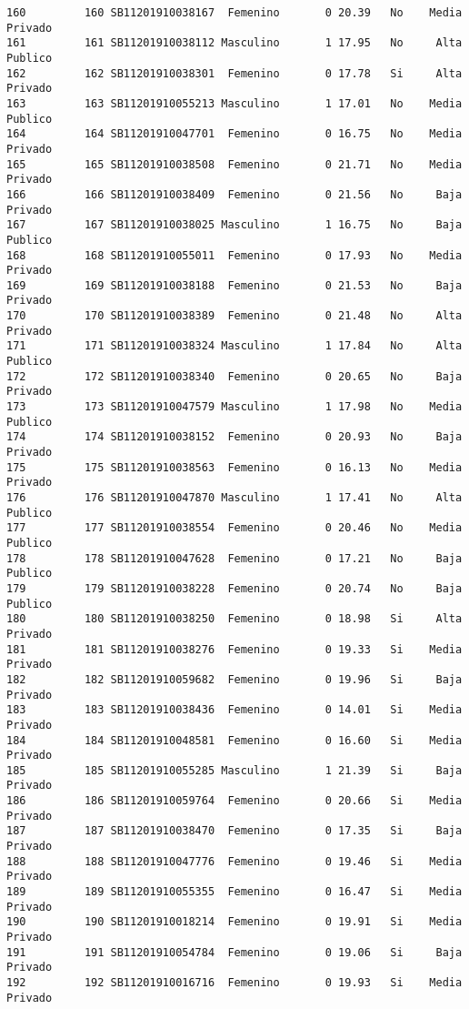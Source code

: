 \documentclass[
  letterpaper,
  DIV=11,
  numbers=noendperiod]{scrartcl}
\begin{document}
\begin{verbatim}
160         160 SB11201910038167  Femenino       0 20.39   No    Media Privado
161         161 SB11201910038112 Masculino       1 17.95   No     Alta Publico
162         162 SB11201910038301  Femenino       0 17.78   Si     Alta Privado
163         163 SB11201910055213 Masculino       1 17.01   No    Media Publico
164         164 SB11201910047701  Femenino       0 16.75   No    Media Privado
165         165 SB11201910038508  Femenino       0 21.71   No    Media Privado
166         166 SB11201910038409  Femenino       0 21.56   No     Baja Privado
167         167 SB11201910038025 Masculino       1 16.75   No     Baja Publico
168         168 SB11201910055011  Femenino       0 17.93   No    Media Privado
169         169 SB11201910038188  Femenino       0 21.53   No     Baja Privado
170         170 SB11201910038389  Femenino       0 21.48   No     Alta Privado
171         171 SB11201910038324 Masculino       1 17.84   No     Alta Publico
172         172 SB11201910038340  Femenino       0 20.65   No     Baja Privado
173         173 SB11201910047579 Masculino       1 17.98   No    Media Publico
174         174 SB11201910038152  Femenino       0 20.93   No     Baja Privado
175         175 SB11201910038563  Femenino       0 16.13   No    Media Privado
176         176 SB11201910047870 Masculino       1 17.41   No     Alta Publico
177         177 SB11201910038554  Femenino       0 20.46   No    Media Publico
178         178 SB11201910047628  Femenino       0 17.21   No     Baja Publico
179         179 SB11201910038228  Femenino       0 20.74   No     Baja Publico
180         180 SB11201910038250  Femenino       0 18.98   Si     Alta Privado
181         181 SB11201910038276  Femenino       0 19.33   Si    Media Privado
182         182 SB11201910059682  Femenino       0 19.96   Si     Baja Privado
183         183 SB11201910038436  Femenino       0 14.01   Si    Media Privado
184         184 SB11201910048581  Femenino       0 16.60   Si    Media Privado
185         185 SB11201910055285 Masculino       1 21.39   Si     Baja Privado
186         186 SB11201910059764  Femenino       0 20.66   Si    Media Privado
187         187 SB11201910038470  Femenino       0 17.35   Si     Baja Privado
188         188 SB11201910047776  Femenino       0 19.46   Si    Media Privado
189         189 SB11201910055355  Femenino       0 16.47   Si    Media Privado
190         190 SB11201910018214  Femenino       0 19.91   Si    Media Privado
191         191 SB11201910054784  Femenino       0 19.06   Si     Baja Privado
192         192 SB11201910016716  Femenino       0 19.93   Si    Media Privado

\end{verbatim}
\end{document}
